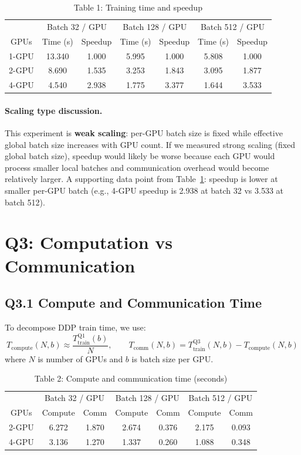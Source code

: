 \documentclass[11pt, letterpaper]{article}
\begin{document}
\begin{table}[h]
\centering
\caption{Table 1: Training time and speedup}
\label{tab:q2}
\begin{tabular}{c|cc|cc|cc}
\toprule
 & \multicolumn{2}{c|}{Batch 32 / GPU} & \multicolumn{2}{c|}{Batch 128 / GPU} & \multicolumn{2}{c}{Batch 512 / GPU} \\
GPUs & Time (s) & Speedup & Time (s) & Speedup & Time (s) & Speedup \\
\midrule
1-GPU & 13.340 & 1.000 & 5.995 & 1.000 & 5.808 & 1.000 \\
2-GPU & 8.690  & 1.535 & 3.253 & 1.843 & 3.095 & 1.877 \\
4-GPU & 4.540  & 2.938 & 1.775 & 3.377 & 1.644 & 3.533 \\
\bottomrule
\end{tabular}
\end{table}

\paragraph{Scaling type discussion.}
This experiment is \textbf{weak scaling}: per-GPU batch size is fixed while effective global batch size increases with GPU count.  
If we measured strong scaling (fixed global batch size), speedup would likely be worse because each GPU would process smaller local batches and communication overhead would become relatively larger.  
A supporting data point from Table~\ref{tab:q2}: speedup is lower at smaller per-GPU batch (e.g., 4-GPU speedup is 2.938 at batch 32 vs 3.533 at batch 512).

\section{Q3: Computation vs Communication}
\subsection*{Q3.1 Compute and Communication Time}
To decompose DDP train time, we use:
\[
T_{\text{compute}}(N,b)\approx \frac{T^{\text{Q1}}_{\text{train}}(b)}{N},\qquad
T_{\text{comm}}(N,b)=T^{\text{Q3}}_{\text{train}}(N,b)-T_{\text{compute}}(N,b)
\]
where $N$ is number of GPUs and $b$ is batch size per GPU.

\begin{table}[h]
\centering
\caption{Table 2: Compute and communication time (seconds)}
\label{tab:q3_1}
\begin{tabular}{c|cc|cc|cc}
\toprule
 & \multicolumn{2}{c|}{Batch 32 / GPU} & \multicolumn{2}{c|}{Batch 128 / GPU} & \multicolumn{2}{c}{Batch 512 / GPU} \\
GPUs & Compute & Comm & Compute & Comm & Compute & Comm \\
\midrule
2-GPU & 6.272 & 1.870 & 2.674 & 0.376 & 2.175 & 0.093 \\
4-GPU & 3.136 & 1.270 & 1.337 & 0.260 & 1.088 & 0.348 \\
\bottomrule
\end{tabular}
\end{table}
\end{document}
